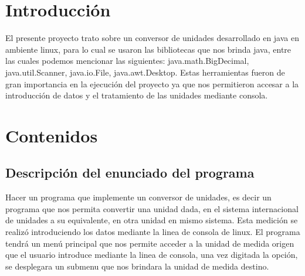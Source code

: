 \documentclass[times,12pt]{article}
\begin{document}
\makeatother





















\begin{abstract}
Java, conversor,excepciones,men\'u,submenu funciones, m\'odulos, bibliotecas, algoritmo,POO, interfaz.
\end{abstract}

\section{Introducci\'on}


El presente proyecto trato sobre un conversor de unidades desarrollado en java en ambiente linux, para lo cual se usaron las bibliotecas que nos brinda java, entre las cuales podemos mencionar las siguientes: java.math.BigDecimal, java.util.Scanner, java.io.File, java.awt.Desktop. Estas herramientas fueron de gran importancia en la ejecuci\'on del proyecto ya que nos permitieron accesar a la introducci\'on de datos y el tratamiento de las unidades mediante consola.

\section{Contenidos}
\label{sect:basics}


\subsection{Descripci\'on del enunciado del programa}

Hacer un programa que implemente un conversor de unidades, es decir un programa que nos permita convertir una unidad dada, en el sistema internacional de unidades a su equivalente, en otra unidad en mismo sistema. Esta medici\'on se realiz\'o introduciendo los datos mediante la linea de consola de linux. El programa tendr\'a un men\'u principal que nos permite acceder a la unidad de medida origen que el usuario introduce mediante la linea de consola, una vez digitada la opci\'on, se desplegara un submenu que nos brindara la unidad de medida destino.
\end{document}
